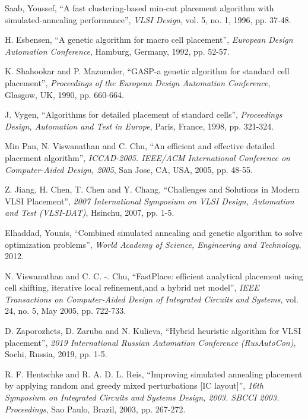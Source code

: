 \documentclass[conference]{IEEEtran}
\begin{document}
\begin{thebibliography}{00}

 Saab, Youssef, ``A fast clustering-based min-cut placement algorithm with simulated-annealing performance'', \textit{VLSI Design}, vol. 5, no. 1, 1996, pp. 37-48.

 H. Esbensen, ``A genetic algorithm for macro cell placement'', \textit{European Design Automation Conference}, Hamburg, Germany, 1992, pp. 52-57.

 K. Shahookar and P. Mazumder, ``GASP-a genetic algorithm for standard cell placement'', \textit{Proceedings of the European Design Automation Conference}, Glasgow, UK, 1990, pp. 660-664.

 J. Vygen, ``Algorithms for detailed placement of standard cells'', \textit{Proceedings Design, Automation and Test in Europe}, Paris, France, 1998, pp. 321-324.

 Min Pan, N. Viswanathan and C. Chu, ``An efficient and effective detailed placement algorithm'', \textit{ICCAD-2005. IEEE/ACM International Conference on Computer-Aided Design, 2005}, San Jose, CA, USA, 2005, pp. 48-55.

 Z. Jiang, H. Chen, T. Chen and Y. Chang, ``Challenges and Solutions in Modern VLSI Placement'', \textit{2007 International Symposium on VLSI Design, Automation and Test (VLSI-DAT)}, Hsinchu, 2007, pp. 1-5.

 Elhaddad, Younis, ``Combined simulated annealing and genetic algorithm to solve optimization problems'', \textit{World Academy of Science, Engineering and Technology}, 2012.

 N. Viswanathan and C. C. -. Chu, ``FastPlace: efficient analytical placement using cell shifting, iterative local refinement,and a hybrid net model'', \textit{IEEE Transactions on Computer-Aided Design of Integrated Circuits and Systems}, vol. 24, no. 5, May 2005, pp. 722-733.

 D. Zaporozhets, D. Zaruba and N. Kulieva, ``Hybrid heuristic algorithm for VLSI placement'', \textit{2019 International Russian Automation Conference (RusAutoCon)}, Sochi, Russia, 2019, pp. 1-5.

 R. F. Hentschke and R. A. D. L. Reis, ``Improving simulated annealing placement by applying random and greedy mixed perturbations [IC layout]'', \textit{16th Symposium on Integrated Circuits and Systems Design, 2003. SBCCI 2003. Proceedings}, Sao Paulo, Brazil, 2003, pp. 267-272.


\end{thebibliography}
\end{document}
